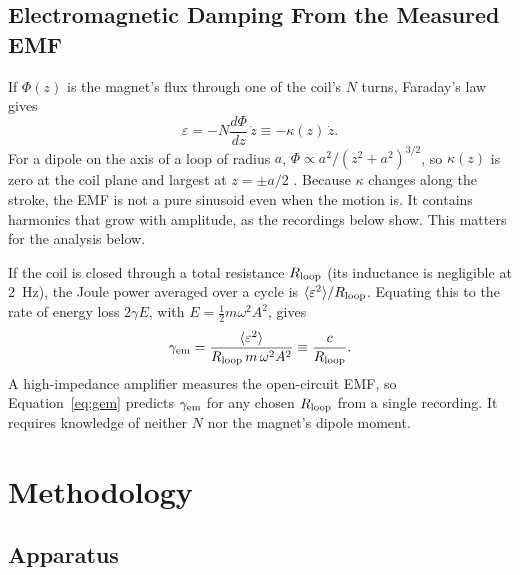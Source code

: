 \documentclass[12pt,a4paper]{article}
\begin{document}
\subsection{Electromagnetic Damping From the Measured EMF}

If $\Phi(z)$ is the magnet's flux through one of the coil's $N$ turns, Faraday's law gives
\begin{equation}
\varepsilon = -N\frac{d\Phi}{dz}\,\dot z \equiv -\kappa(z)\,\dot z .
\end{equation}
For a dipole on the axis of a loop of radius $a$, $\Phi \propto a^2/(z^2+a^2)^{3/2}$, so $\kappa(z)$ is zero at the coil plane and largest at $z=\pm a/2$ \parencite{Griffiths2017}. Because $\kappa$ changes along the stroke, the EMF is not a pure sinusoid even when the motion is. It contains harmonics that grow with amplitude, as the recordings below show. This matters for the analysis below.

If the coil is closed through a total resistance $R_{\rm loop}$ (its inductance is negligible at \SI{2}{Hz}), the Joule power averaged over a cycle is $\langle\varepsilon^2\rangle/R_{\rm loop}$. Equating this to the rate of energy loss $2\gamma E$, with $E = \tfrac12 m\omega^2A^2$, gives
\begin{equation}
\gamma_{\rm em} = \frac{\langle\varepsilon^2\rangle}{R_{\rm loop}\, m\,\omega^2 A^2} \equiv \frac{c}{R_{\rm loop}} .
\label{eq:gem}
\end{equation}
A high-impedance amplifier measures the open-circuit EMF, so Equation~\ref{eq:gem} predicts $\gamma_{\rm em}$ for any chosen $R_{\rm loop}$ from a single recording. It requires knowledge of neither $N$ nor the magnet's dipole moment.

\section{Methodology}

\subsection{Apparatus}
\end{document}
